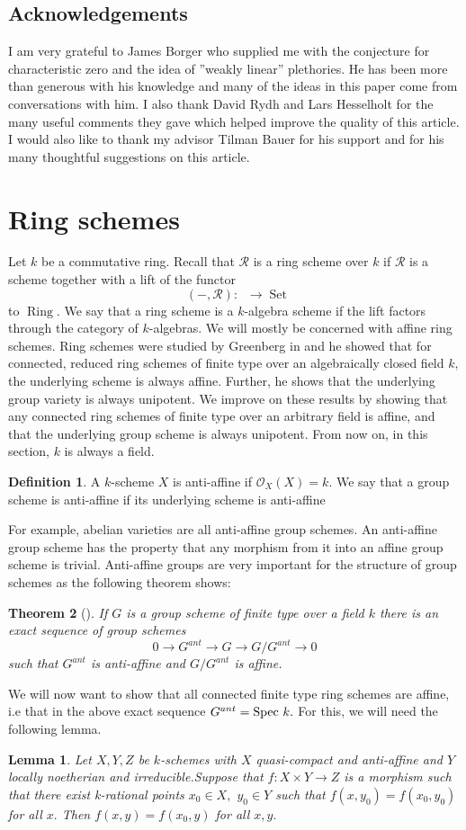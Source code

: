 \documentclass[a4paper, 12pt]{amsart}
\DeclareMathOperator{\Set}{Set}
\DeclareMathOperator{\Schk}{Sch_k}
\newcommand{\Ring}{{\operatorname{Ring}}}
\numberwithin{equation}{section}
\newtheorem{lemma}[equation]{Lemma}
\newtheorem{theorem}{Theorem}[section]
\theoremstyle{definition}
\newtheorem{definition}[theorem]{Definition}
\begin{document}
\subsection*{Acknowledgements}
I am very grateful to James Borger who supplied me with the conjecture for characteristic zero and the idea of ''weakly linear'' plethories. He has been more than generous with his knowledge and many of the ideas in this paper come from conversations with him. I also thank David Rydh and Lars Hesselholt for the many useful comments they gave which helped improve the quality of this article. I would also like to thank my advisor Tilman Bauer for his support and for his many thoughtful suggestions on this article.
\section{Ring schemes}
\noindent Let $k$ be a commutative ring. Recall that $\mathcal{R}$ is a ring scheme over $k$
if $\mathcal{R}$ is a scheme together with a lift of the functor $$\Schk(-,\mathcal{R}):\Schk \rightarrow \Set$$
to $\Ring.$ We say
that a ring scheme is a $k$-algebra scheme if the lift factors through the category of $k$-algebras. We will mostly be concerned with affine
ring schemes. Ring schemes were studied by Greenberg in \cite{Greenberg63} and he showed that for connected, reduced ring schemes of finite
type over an algebraically closed field $k,$ the underlying scheme
is always affine. Further, he shows that the underlying group variety is
always unipotent. We improve on these results by showing that any connected ring schemes of finite type over
an arbitrary field is affine, and that the 
underlying group scheme is always unipotent. From now on, in this section, $k$ is always
a field.
\begin{definition}
A $k$-scheme $X$ is anti-affine if $\mathcal{O}_X(X)=k.$ We say that a group
scheme is anti-affine if its underlying scheme is anti-affine
\end{definition}
\noindent
For example, abelian varieties are all anti-affine group schemes. An anti-affine group scheme has the property that any morphism from it into an affine group scheme is trivial. Anti-affine groups are very important for the structure of group schemes as the following theorem shows:
\begin{theorem} [{\cite[Theorem 1]{BrionStr}}] \label{Brionstructure}
If $G$ is a group scheme of finite type over a field $k$ there is an exact sequence of group schemes $$0 \rightarrow G^{ant} \rightarrow G \rightarrow G/G^{ant} \rightarrow 0$$ such that $G^{ant}$ is anti-affine and $G/G^{ant}$ is affine.
\end{theorem}
\noindent We will now want to show that all connected finite type ring schemes are affine, i.e that in the above exact sequence $G^{ant} = \text{Spec } k.$ For this, we will need the following lemma.
\begin{lemma}
Let $X,Y,Z$ be $k$-schemes with $X$ quasi-compact and anti-affine and
$Y$ locally noetherian and irreducible.Suppose that $f:X \times Y
\rightarrow Z$ is a morphism such that there exist k-rational points
$x_0 \in X,$ $y_0 \in Y$ such that $f(x,y_0) =f(x_0,y_0)$ for all $x.$
Then $f(x,y)=f(x_0,y)$ for all $x,y.$
\end{lemma}
\end{document}
